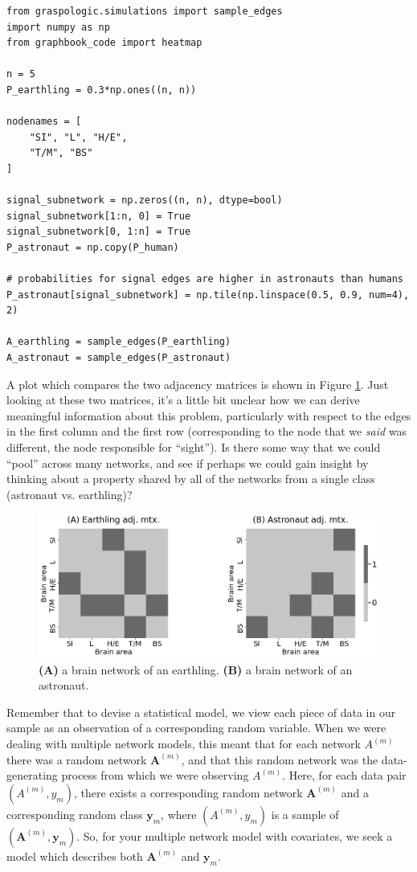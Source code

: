 \begin{lstlisting}[style=python]
from graspologic.simulations import sample_edges
import numpy as np
from graphbook_code import heatmap

n = 5
P_earthling = 0.3*np.ones((n, n))

nodenames = [
    "SI", "L", "H/E", 
    "T/M", "BS"
]

signal_subnetwork = np.zeros((n, n), dtype=bool)
signal_subnetwork[1:n, 0] = True
signal_subnetwork[0, 1:n] = True
P_astronaut = np.copy(P_human)

# probabilities for signal edges are higher in astronauts than humans
P_astronaut[signal_subnetwork] = np.tile(np.linspace(0.5, 0.9, num=4), 2)

A_earthling = sample_edges(P_earthling)
A_astronaut = sample_edges(P_astronaut)
\end{lstlisting}

A plot which compares the two adjacency matrices is shown in Figure \ref{fig:ch5:ssg_samps}. Just looking at these two matrices, it's a little bit unclear how we can derive meaningful information about this problem, particularly with respect to the edges in the first column and the first row (corresponding to the node that we \textit{said} was different, the node responsible for ``sight''). Is there some way that we could ``pool'' across many networks, and see if perhaps we could gain insight by thinking about a property shared by all of the networks from a single class (astronaut vs. earthling)?

\begin{figure}
    \centering
    \includegraphics[width=0.7\linewidth]{representations/ch5/Images/ssg_samps.png}
    \caption[Two samples of adjacency matrices from the signal sub network model]{\textbf{(A)} a brain network of an earthling. \textbf{(B)} a brain network of an astronaut.}
    \label{fig:ch5:ssg_samps}
\end{figure}

Remember that to devise a statistical model, we view each piece of data in our sample as an observation of a corresponding random variable. When we were dealing with multiple network models, this meant that for each network $A^{(m)}$ there was a random network $\mathbf A^{(m)}$, and that this random network was the data-generating process from which we were observing $A^{(m)}$. Here, for each data pair $(A^{(m)}, y_m)$, there exists a corresponding random network $\mathbf A^{(m)}$ and a corresponding random class $\mathbf y_m$, where $(A^{(m)}, y_m)$ is a sample of $(\mathbf A^{(m)}, \mathbf y_m)$. So, for your multiple network model with covariates, we seek a model which describes both $\mathbf A^{(m)}$ and $\mathbf y_m$.


